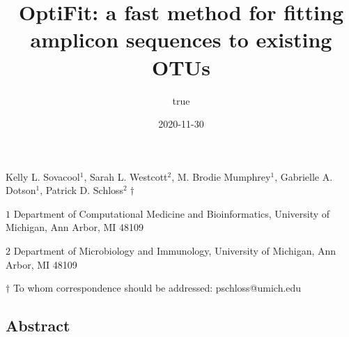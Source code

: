 \documentclass[
  12pt,
]{article}
\title{\textbf{OptiFit: a fast method for fitting amplicon sequences to
existing OTUs}}
\author{true}
\date{2020-11-30}
\begin{document}
\maketitle

\begin{center}
\vspace{25mm}

Kelly L. Sovacool${^1}$, Sarah L. Westcott${^2}$, M. Brodie Mumphrey${^1}$,
Gabrielle A. Dotson${^1}$, Patrick D. Schloss${^2\dagger}$

$1$ Department of Computational Medicine and Bioinformatics,
University of Michigan, Ann Arbor, MI 48109

$2$ Department of Microbiology and Immunology,
University of Michigan, Ann Arbor, MI 48109

\vspace{30mm}

$\dagger$ To whom correspondence should be addressed: pschloss@umich.edu

\end{center}

\newpage
\linenumbers

\hypertarget{abstract}{%
\subsection{Abstract}\label{abstract}}
\end{document}
